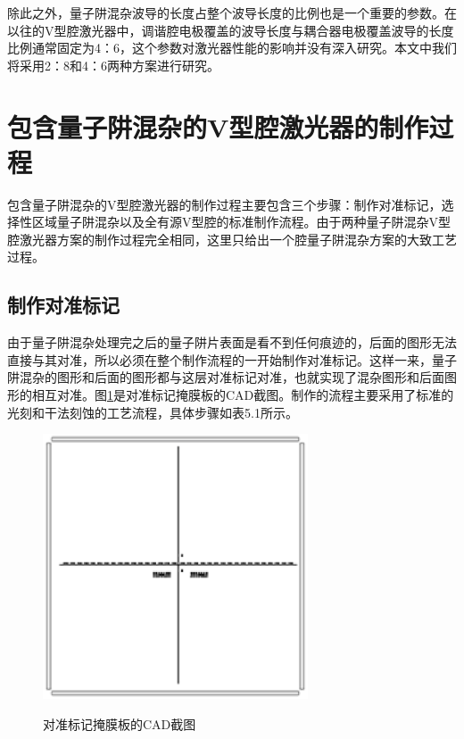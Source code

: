 \documentclass{ZJUthesis}
\begin{document}
除此之外，量子阱混杂波导的长度占整个波导长度的比例也是一个重要的参数。在以往的V型腔激光器中，调谐腔电极覆盖的波导长度与耦合器电极覆盖波导的长度比例通常固定为4：6，这个参数对激光器性能的影响并没有深入研究。本文中我们将采用2：8和4：6两种方案进行研究。

\section{包含量子阱混杂的V型腔激光器的制作过程}

包含量子阱混杂的V型腔激光器的制作过程主要包含三个步骤：制作对准标记，选择性区域量子阱混杂以及全有源V型腔的标准制作流程。由于两种量子阱混杂V型腔激光器方案的制作过程完全相同，这里只给出一个腔量子阱混杂方案的大致工艺过程。

\subsection{制作对准标记}

由于量子阱混杂处理完之后的量子阱片表面是看不到任何痕迹的，后面的图形无法直接与其对准，所以必须在整个制作流程的一开始制作对准标记。这样一来，量子阱混杂的图形和后面的图形都与这层对准标记对准，也就实现了混杂图形和后面图形的相互对准。图\ref{fig_marker}是对准标记掩膜板的CAD截图。制作的流程主要采用了标准的光刻和干法刻蚀的工艺流程，具体步骤如表5.1所示。

\begin{figure}[!ht]
  \centering
  \includegraphics[width=0.7\textwidth]{./Pictures/marker.eps}\\
  \caption{对准标记掩膜板的CAD截图}
  \label{fig_marker}
\end{figure}
\end{document}
